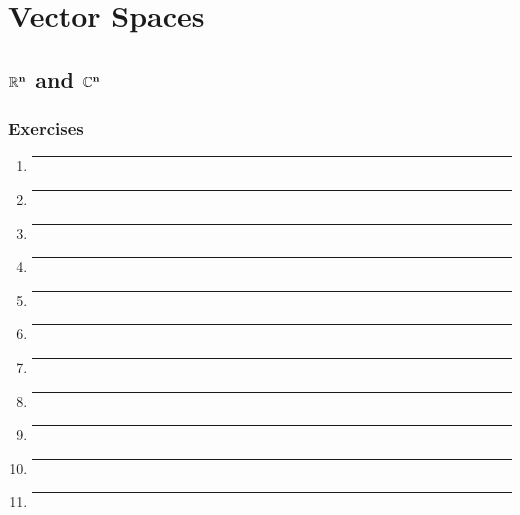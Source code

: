 \chapter{Vector Spaces}
\section{$\mathbf{\mathbb{R}^n}$ and $\mathbf{\mathbb{C}^n}$}
\subsection{Exercises}

\begin{enumerate}[label=\textbf{\arabic*}]

\item{
  \lipsum[66]
  \bigbreak
  \hrule
  \bigbreak
}

\item{
\lipsum[75]
\bigbreak
\hrule
\bigbreak
}

\item{
  \lipsum[74]
  \bigbreak
  \hrule
  \bigbreak
}

\item{
  \lipsum[64]
  \bigbreak
  \hrule
  \bigbreak
}

\item{
  \lipsum[2]
  \bigbreak
  \hrule
  \bigbreak
}

\item{
  \lipsum[3]
  \bigbreak
  \hrule
  \bigbreak
}

\item{
  \lipsum[4]
  \bigbreak
  \hrule
  \bigbreak
}

\item{
  \lipsum[17]
  \bigbreak
  \hrule
  \bigbreak
}

\item{
  \lipsum[6]
  \bigbreak
  \hrule
  \bigbreak
}

\item{
  \lipsum[7]
  \bigbreak
  \hrule
  \bigbreak
}

\item{
  \lipsum[8]
  \bigbreak
  \hrule
  \bigbreak
}


\end{enumerate}
